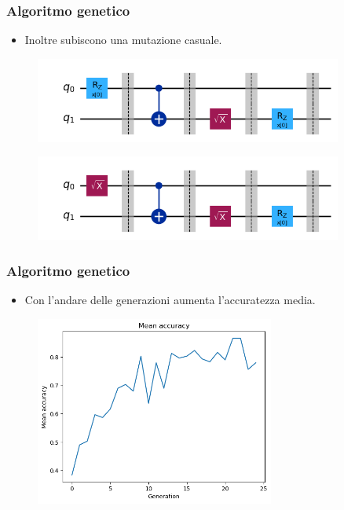\documentclass{beamer}
\begin{document}
\begin{frame}
  \frametitle{Algoritmo genetico}
  \begin{itemize}
    \item Inoltre subiscono una mutazione casuale.  
  \end{itemize}

  \begin{figure}
    \includegraphics[width=0.9\textwidth]{images/nonmutated.png}
  \end{figure} 
  \begin{figure}
    \includegraphics[width=0.9\textwidth]{images/mutated.png}
  \end{figure} 
\end{frame}

\begin{frame}
  \frametitle{Algoritmo genetico}
  \begin{itemize}
    \item Con l'andare delle generazioni aumenta l'accuratezza media.  
  \end{itemize}

  \begin{figure}
    \includegraphics[width=0.7\textwidth]{images/meanaccuracy.png}
  \end{figure} 

\end{frame}
\end{document}
